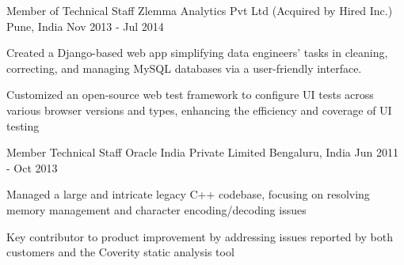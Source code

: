 \begin{cventries}
\cventry
{Member of Technical Staff} %
{Zlemma Analytics Pvt Ltd (Acquired by Hired Inc.)} %
{Pune, India} %
{Nov 2013 - Jul 2014} %
{ %
\begin{cvitems}
\item {Created a Django-based web app simplifying data engineers' tasks in cleaning, correcting, and managing MySQL databases via a user-friendly interface.}
\item {Customized an open-source web test framework to configure UI tests across various browser versions and types, enhancing the efficiency and coverage of UI testing}
\end{cvitems}
}
\cventry
{Member Technical Staff} %
{Oracle India Private Limited} %
{Bengaluru, India} %
{Jun 2011 - Oct 2013} %
{ %
	\begin{cvitems}
		\item {Managed a large and intricate legacy C++ codebase, focusing on resolving memory management and character encoding/decoding issues}
		\item {Key contributor to product improvement by addressing issues reported by both customers and the Coverity static analysis tool}
	\end{cvitems}
}

\end{cventries}
